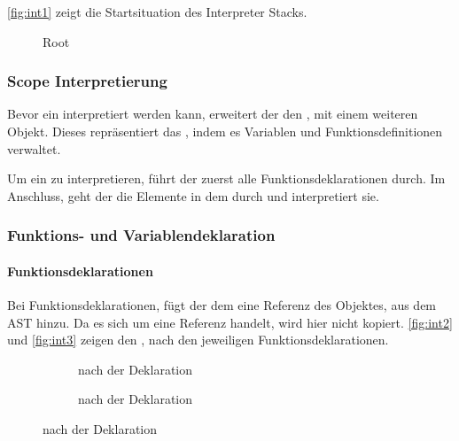 {{    \autoref{fig:int1} zeigt die Startsituation des Interpreter Stacks.
    \begin{figure}[H]
      \centering
      \caption{Root }
      \label{fig:int1}
    \end{figure}

    \subsubsection{Scope Interpretierung}
    \label{sssec:Scope Interpretierung}
      Bevor ein  interpretiert werden kann, erweitert der  den , mit einem weiteren  Objekt. Dieses repräsentiert das , indem es Variablen und Funktionsdefinitionen verwaltet.

      Um ein  zu interpretieren, führt der  zuerst alle Funktionsdeklarationen durch. Im Anschluss, geht der  die  Elemente in dem  durch und interpretiert sie.

    \subsubsection{Funktions- und Variablendeklaration}
    \label{sssec:Funktions- und Variablendeklaration}
      \paragraph{Funktionsdeklarationen}
        Bei Funktionsdeklarationen, fügt der  dem  eine Referenz des  Objektes, aus dem AST hinzu. Da es sich um eine Referenz handelt, wird hier nicht kopiert. \autoref{fig:int2} und \autoref{fig:int3} zeigen den , nach den jeweiligen Funktionsdeklarationen.
        \begin{figure}[H]
          \centering
          \begin{minipage}{.45\linewidth}
              \begin{figure}[H]
                \centering
                \caption{ nach der  Deklaration}
                \label{fig:int2}
              \end{figure}
          \end{minipage}%
          \begin{minipage}{.45\linewidth}
            \begin{figure}[H]
              \centering
              \caption{ nach der  Deklaration}
              \label{fig:int3}
            \end{figure}
          \end{minipage}
        \end{figure}

}}
